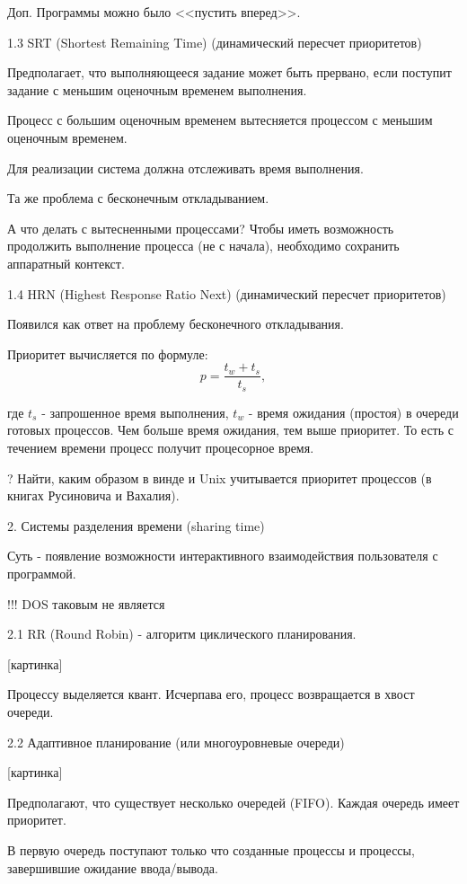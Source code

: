 \documentclass[14pt, a4paper]{article}
\begin{document}
	Доп. Программы можно было <<пустить вперед>>.
	
	1.3 SRT (Shortest Remaining Time) (динамический пересчет приоритетов)
	
	Предполагает, что выполняющееся задание может быть прервано, если поступит задание с меньшим оценочным временем выполнения.
	
	Процесс с большим оценочным временем вытесняется процессом с меньшим оценочным временем.
	
	Для реализации система должна отслеживать время выполнения.
	
	Та же проблема с бесконечным откладыванием.
	
	А что делать с вытесненными процессами? Чтобы иметь возможность продолжить выполнение процесса (не с начала), необходимо сохранить аппаратный контекст.
	
	1.4 HRN (Highest Response Ratio Next) (динамический пересчет приоритетов)
	
	Появился как ответ на проблему бесконечного откладывания.
	
	Приоритет вычисляется по формуле: $$p = \frac{t_w + t_s}{t_s},$$
	
	где $t_s$ - запрошенное время выполнения, $t_w$ - время ожидания (простоя) в очереди готовых процессов. Чем больше время ожидания, тем выше приоритет. То есть с течением времени процесс получит процесорное время.
	
	? Найти, каким образом в винде и Unix учитывается приоритет процессов (в книгах Русиновича и Вахалия).
	
	2. Системы разделения времени (sharing time)
	
	Суть - появление возможности интерактивного взаимодействия пользователя с программой.
	
	!!! DOS таковым не является
	
	2.1 RR (Round Robin) - алгоритм циклического планирования.
	
	[картинка]
	
	Процессу выделяется квант. Исчерпава его, процесс возвращается в хвост очереди.
	
	2.2 Адаптивное планирование (или многоуровневые очереди)
	
	[картинка]
	
	Предполагают, что существует несколько очередей (FIFO). Каждая очередь имеет приоритет.
	
	В первую очередь поступают только что созданные процессы и процессы, завершившие ожидание ввода/вывода.
	
\end{document}
